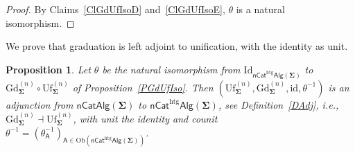 \documentclass[a4paper, reqno]{amsbook}
\newcommand{\sig}[1]{\mathbf{#1}}             %
\newcommand{\calg}[1]{\boldsymbol{\mathsf{#1}}} %
\newcommand{\htg}{\mathrm{htg}}                %
\newcommand{\id}{\mathrm{id}}
\newcommand{\Id}{\mathrm{Id}}
\newcommand{\Gd}{\mathrm{Gd}}
\newcommand{\Uf}{\mathrm{Uf}}
\theoremstyle{plain}
\newtheorem{proposition}[theorem]{Proposition}
\theoremstyle{definition}
\begin{document}
\begin{proof}
By Claims~\ref{ClGdUfIsoD} and~\ref{ClGdUfIsoE}, $\theta$ is a natural isomorphism. 
\end{proof}

We prove that graduation is left adjoint to unification, with the identity as unit.

\begin{proposition}\label{PGdUfAdj}
Let $\theta$ be the natural isomorphism from $\Id_{\mathsf{nCat}^{\htg}\mathsf{Alg}(\sig{\Sigma})}$ to $\Gd^{(n)}_{\sig{\Sigma}}\circ\Uf^{(n)}_{\sig{\Sigma}}$ of Proposition~\ref{PGdUfIso}.
Then $(\Uf^{(n)}_{\sig{\Sigma}},\Gd^{(n)}_{\sig{\Sigma}},\id,\theta^{-1})$ is an adjunction from $\mathsf{nCatAlg}(\sig{\Sigma})$ to $\mathsf{nCat}^{\htg}\mathsf{Alg}(\sig{\Sigma})$, see Definition~\ref{DAdj}, i.e., $\Gd^{(n)}_{\sig{\Sigma}}\dashv\Uf^{(n)}_{\sig{\Sigma}}$, with unit the identity and counit $\theta^{-1}=(\theta^{-1}_{\calg{A}})_{\calg{A}\in\mathrm{Ob}(\mathsf{nCat}^{\htg}\mathsf{Alg}(\sig{\Sigma}))}$.
\end{proposition}
\end{document}

